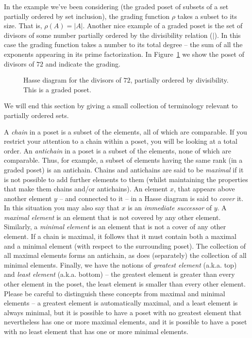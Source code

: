 In the example we've been considering (the graded poset of subsets of a set
partially ordered by set inclusion), the grading function $\rho$ takes a
subset to its size.  That is, $\rho(A) = |A|$.  Another nice example of
a graded poset is the set of divisors of some number partially ordered
by the divisibility relation ($\mid$).  In this case the grading function
takes a number to its total degree -- the sum of all the exponents
appearing in its prime factorization.  In Figure~\ref{fig:divisors_of_72}
we show the poset of divisors of $72$ and indicate the grading.

\begin{figure}[!hbtp]

\caption[Hasse diagram of divisors of 72.]{Hasse %
diagram for the divisors of $72$, partially ordered by %
divisibility.  This is a graded poset.}
\label{fig:divisors_of_72} 
\end{figure}

We will end this section by giving a small collection of terminology
relevant to partially ordered sets.

A \emph{chain} in a poset is a subset of the elements, all 
of which are comparable.  If you restrict your attention to a chain within 
a poset, you will be looking at a total order.  
An \emph{antichain} in a poset is a subset
of the elements, none of which are comparable.  Thus, for example, a subset
of elements having the same rank (in a graded poset) is an antichain.  
Chains and antichains are said to be \emph{maximal} if it
is not possible to add further elements to them (whilst maintaining the 
properties that make them chains and/or antichains).  An element $x$, that 
appears above another element $y$ -- and connected to it -- in a Hasse
diagram is said to \emph{cover} it.  In this situation
you may also say that $x$ is an \emph{immediate successor} of
$y$.  A \emph{maximal element} is an element that is not covered by any other element.  Similarly, a 
\emph{minimal element} is an element that is not a cover of any other element.  If a chain is maximal, it follows that it
must contain both a maximal and a minimal element (with respect to the
surrounding poset).  The collection of all maximal elements forms an antichain,
as does (separately) the collection of all minimal elements.  Finally,
we have the notions of  
\emph{greatest element} (a.k.a. top) and 
\emph{least element} (a.k.a. 
bottom) -- the greatest element is greater than every
other element in the poset,  the least element is smaller than every other element.  Please be careful to distinguish these
concepts from maximal and minimal elements -- a greatest element is 
automatically maximal, and a least element is always minimal, but it 
is possible to have a poset with no greatest element that nevertheless 
has one or more maximal elements, and it is possible to have a poset with no
least element that has one or more minimal elements. 


